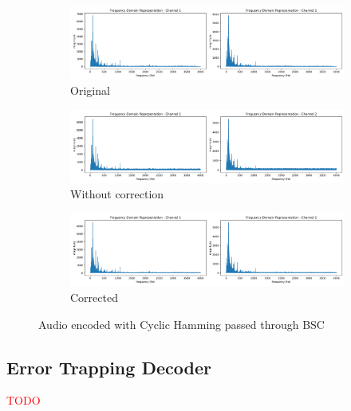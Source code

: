 \documentclass{article}
\begin{document}
\begin{figure}[htb]
    \centering
    \begin{subfigure}[b]{\textwidth}
        \centering
        \includegraphics[width=\textwidth]{../Result/Cyclic/15-11/wav-frequency-domain-TX.png}
        \caption{Original}
        \label{fig:f-audio-cyclic-bsc-original}
    \end{subfigure}
    \begin{subfigure}[b]{\textwidth}
        \centering
        \includegraphics[width=\textwidth]{../Result/Cyclic/15-11/cyclic-bsc-wav-frequency-domain-RX.png}
        \caption{Without correction}
        \label{fig:f-audio-cyclic-bsc-no-correction}
    \end{subfigure}
    \begin{subfigure}[b]{\textwidth}
        \centering
        \includegraphics[width=\textwidth]{../Result/Cyclic/15-11/cyclic-bsc-wav-frequency-domain-RX-syndrome-corrected.png}
        \caption{Corrected}
        \label{fig:f-audio-cyclic-bsc-syndrome-corrected}
    \end{subfigure}
       \caption{Audio encoded with Cyclic Hamming passed through BSC}
       \label{fig:f-audio-cyclic-bsc}
\end{figure}






\subsection{Error Trapping Decoder}
\textcolor{red}{TODO}
\end{document}
